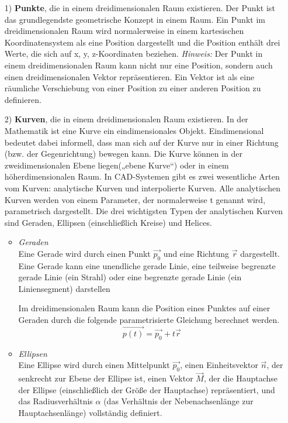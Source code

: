 \documentclass[14pt,a4paper,titlepage]{article}
\begin{document}
		\begin{itemize}
			\item[1)]
			\textbf{Punkte}, die in einem dreidimensionalen Raum existieren.
			\linebreak
			Der Punkt ist das grundlegendste geometrische Konzept in einem Raum. Ein Punkt im dreidimensionalen Raum wird normalerweise in einem kartesischen Koordinatensystem als eine Position dargestellt und die Position enthält drei Werte, die sich auf x, y, z-Koordinaten beziehen. 
			\bigbreak
			\emph{Hinweis:}
			\linebreak
			{\small Der Punkt in einem dreidimensionalen Raum kann nicht nur eine Position, sondern auch einen dreidimensionalen Vektor repräsentieren. Ein Vektor ist als eine räumliche Verschiebung von einer Position zu einer anderen Position zu definieren.}    
			\item[2)] 
			\textbf{Kurven}, die in einem dreidimensionalen Raum existieren.
			\linebreak
			In der Mathematik ist eine Kurve ein eindimensionales Objekt. Eindimensional bedeutet dabei informell, dass man sich auf der Kurve nur in einer Richtung (bzw. der Gegenrichtung) bewegen kann. Die Kurve können in der zweidimensionalen Ebene liegen(„ebene Kurve“) oder in einem höherdimensionalen Raum\cite{kurve}.
			\bigbreak
			In CAD-Systemen gibt es zwei wesentliche Arten vom Kurven: analytische Kurven und interpolierte Kurven.
			Alle analytischen Kurven werden von einem Parameter, der normalerweise t genannt wird, parametrisch dargestellt. Die drei wichtigsten Typen der analytischen Kurven sind Geraden, Ellipsen (einschließlich Kreise) und Helices.
			
			\begin{itemize}
				\item \emph{Geraden}
				\\
				Eine Gerade wird durch einen Punkt \(\vec{p_0}\) und eine Richtung \(\vec{r}\) dargestellt. Eine Gerade kann eine unendliche gerade Linie, eine teilweise begrenzte gerade Linie (ein Strahl) oder eine begrenzte gerade Linie (ein Liniensegment) darstellen
				
				\bigbreak
				
				Im dreidimensionalen Raum kann die Position eines Punktes auf einer Geraden durch die folgende parametrisierte Gleichung berechnet werden.
			    \[ \vec{p(t)} = \vec{p_0} + t\vec{r} \]
			    
				\item \emph{Ellipsen}
				\\
				Eine Ellipse wird durch einen Mittelpunkt \(\vec{p_0}\), einen Einheitsvektor \(\vec{n}\), der senkrecht zur Ebene der Ellipse ist, einen Vektor \(\vec{M}\), der die Hauptachse der Ellipse (einschließlich der Größe der Hauptachse) repräsentiert, und das Radiusverhältnis \(\alpha\) (das Verhältnis der Nebenachsenlänge zur Hauptachsenlänge) vollständig definiert.
				

\end{itemize}
\end{itemize}
\end{document}
